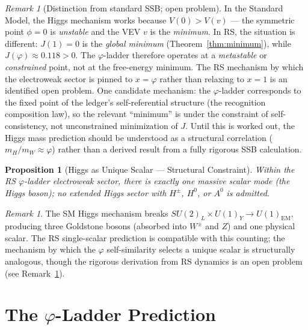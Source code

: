 \documentclass[12pt,a4paper]{article}
\newtheorem{proposition}[theorem]{Proposition}
\theoremstyle{definition}
\theoremstyle{remark}
\newtheorem{remark}[theorem]{Remark}
\begin{document}
\begin{remark}[Distinction from standard SSB; open problem]
\label{rem:ssb-distinction}
In the Standard Model, the Higgs mechanism works because
$V(0) > V(v)$ --- the symmetric point $\phi = 0$ is
\emph{unstable} and the VEV $v$ is the \emph{minimum}.
In RS, the situation is different: $J(1) = 0$ is the
\emph{global minimum} (Theorem~\ref{thm:minimum}), while
$J(\varphi) \approx 0.118 > 0$.  The $\varphi$-ladder
therefore operates at a \emph{metastable} or
\emph{constrained} point, not at the free-energy minimum.
The RS mechanism by which the electroweak sector is pinned
to $x = \varphi$ rather than relaxing to $x = 1$ is an
identified open problem.  One candidate mechanism: the
$\varphi$-ladder corresponds to the fixed point of the
ledger's self-referential structure (the recognition
composition law), so the relevant ``minimum'' is under
the constraint of self-consistency, not unconstrained
minimization of $J$.  Until this is worked out, the Higgs
mass prediction should be understood as a structural
correlation ($m_H/m_W \approx \varphi$) rather than a derived
result from a fully rigorous SSB calculation.
\end{remark}

\begin{proposition}[Higgs as Unique Scalar --- Structural Constraint]
\label{cor:unique}
Within the RS $\varphi$-ladder electroweak sector, there is
exactly one massive scalar mode (the Higgs boson); no
extended Higgs sector with $H^\pm$, $H^0$, or $A^0$ is
admitted.
\end{proposition}

\begin{remark}
The SM Higgs mechanism breaks $SU(2)_L \times U(1)_Y \to
U(1)_{\mathrm{EM}}$, producing three Goldstone bosons
(absorbed into $W^\pm$ and $Z$) and one physical scalar.
The RS single-scalar prediction is compatible with this
counting; the mechanism by which the $\varphi$ self-similarity
selects a unique scalar is structurally analogous, though the
rigorous derivation from RS dynamics is an open problem
(see Remark~\ref{rem:ssb-distinction}).
\end{remark}

\section{The $\varphi$-Ladder Prediction}
\label{sec:prediction}
\end{document}
